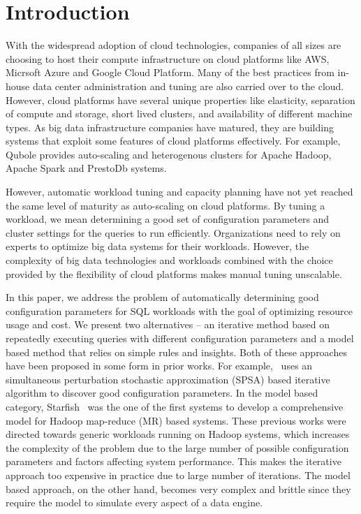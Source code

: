 \section{Introduction}

With the widespread adoption of cloud technologies, companies of all sizes are choosing to host their compute infrastructure on cloud platforms like AWS, Micrsoft Azure and Google Cloud Platform. 
Many of the best practices from in-house data center administration and tuning are also carried over to the cloud. However, cloud platforms have several unique properties like elasticity, separation of compute and storage, short lived clusters, and availability of different machine types. As big data infrastructure companies have matured, they are building systems that exploit some features of cloud platforms effectively. For example, Qubole provides auto-scaling 
and heterogenous clusters for Apache Hadoop, Apache Spark and PrestoDb systems. 

However, automatic workload tuning and capacity planning have not yet reached the same level of maturity as auto-scaling on cloud platforms. By tuning a workload, we mean determining a good set of configuration parameters and cluster settings for the queries to run efficiently. Organizations need to rely on experts to optimize big data systems for their workloads. However, the 
complexity of big data technologies and workloads combined with the choice provided by the flexibility of cloud platforms makes manual tuning unscalable. 

In this paper, we address the problem of automatically determining good configuration parameters for SQL workloads with the goal of optimizing resource usage and cost. We present two alternatives -- an iterative method based on repeatedly executing queries with different configuration parameters and a model based method that relies on simple rules and insights. Both of these approaches have been proposed in some form in prior works. For example,~\cite{KumarPLPGB16} uses an simultaneous perturbation stochastic approximation (SPSA) based iterative algorithm to discover good configuration parameters. In the model based category, Starfish~\cite{herodotou2011profiling, herodotou2011starfish} was the one of the first systems to develop a comprehensive model for Hadoop map-reduce (MR) based systems. These previous works were directed towards generic workloads running on Hadoop systems, which increases the complexity of the problem due to the large number of possible configuration parameters and factors affecting system performance. This makes the iterative approach too expensive in practice due to large number of iterations. The model based approach, on the other hand, becomes very complex and brittle since they require the model to simulate every aspect of a data engine.

